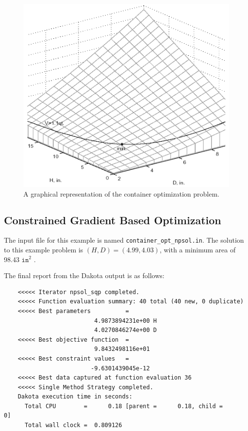 \begin{figure}
  \centering
  \includegraphics[scale=0.3]{images/graphical_container_opt}
  \caption{A graphical representation of the container optimization
    problem.}
  \label{additional:figure02}
\end{figure}

\subsection{Constrained Gradient Based Optimization}

The input file for this example is named
\texttt{container\_opt\_npsol.in}. The solution to this example
problem is $(H,D)=(4.99,4.03)$, with a minimum area of 98.43
$\mathtt{in}^2$ .

The final report from the Dakota output is as follows:
\begin{small}
\begin{verbatim}
    <<<<< Iterator npsol_sqp completed.
    <<<<< Function evaluation summary: 40 total (40 new, 0 duplicate)
    <<<<< Best parameters          =
                          4.9873894231e+00 H
                          4.0270846274e+00 D
    <<<<< Best objective function  =
                          9.8432498116e+01
    <<<<< Best constraint values   =
                         -9.6301439045e-12
    <<<<< Best data captured at function evaluation 36
    <<<<< Single Method Strategy completed.
    Dakota execution time in seconds:
      Total CPU        =      0.18 [parent =      0.18, child =         0]
      Total wall clock =  0.809126
\end{verbatim}
\label{cont_opt_npsol.out}
\end{small}

